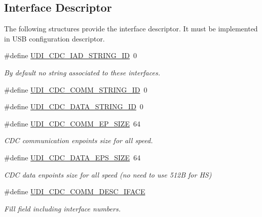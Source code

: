 \subsection*{\-Interface \-Descriptor}
\label{_amgrp550f151b99c19ed40d4ef91c78de1c3b}%
 \-The following structures provide the interface descriptor. \-It must be implemented in \-U\-S\-B configuration descriptor. \begin{DoxyCompactItemize}
\item 
\#define \hyperlink{group__udi__cdc__group_gab60b7a7764b991aff0c527e8fa0ac8c8}{\-U\-D\-I\-\_\-\-C\-D\-C\-\_\-\-I\-A\-D\-\_\-\-S\-T\-R\-I\-N\-G\-\_\-\-I\-D}~0
\begin{DoxyCompactList}\small\item\em \-By default no string associated to these interfaces. \end{DoxyCompactList}\item 
\#define \hyperlink{group__udi__cdc__group_ga4fef11b2181a17d8faac207f30c8a088}{\-U\-D\-I\-\_\-\-C\-D\-C\-\_\-\-C\-O\-M\-M\-\_\-\-S\-T\-R\-I\-N\-G\-\_\-\-I\-D}~0
\item 
\#define \hyperlink{group__udi__cdc__group_ga7f130213f9c935f192ad0e7a79654533}{\-U\-D\-I\-\_\-\-C\-D\-C\-\_\-\-D\-A\-T\-A\-\_\-\-S\-T\-R\-I\-N\-G\-\_\-\-I\-D}~0
\item 
\#define \hyperlink{group__udi__cdc__group_ga186a4ed83a0c245ad4fb377ed96ccd9c}{\-U\-D\-I\-\_\-\-C\-D\-C\-\_\-\-C\-O\-M\-M\-\_\-\-E\-P\-\_\-\-S\-I\-Z\-E}~64
\begin{DoxyCompactList}\small\item\em \-C\-D\-C communication enpoints size for all speed. \end{DoxyCompactList}\item 
\#define \hyperlink{group__udi__cdc__group_gac62f6054c333924c2bef7eddaa9e57ab}{\-U\-D\-I\-\_\-\-C\-D\-C\-\_\-\-D\-A\-T\-A\-\_\-\-E\-P\-S\-\_\-\-S\-I\-Z\-E}~64
\begin{DoxyCompactList}\small\item\em \-C\-D\-C data enpoints size for all speed (no need to use 512\-B for \-H\-S) \end{DoxyCompactList}\item 
\#define \hyperlink{group__udi__cdc__group_gad564430bd926e661c9de9c0b12b372f8}{\-U\-D\-I\-\_\-\-C\-D\-C\-\_\-\-C\-O\-M\-M\-\_\-\-D\-E\-S\-C\-\_\-\-I\-F\-A\-C\-E}
\begin{DoxyCompactList}\small\item\em \-Fill field including interface numbers. \end{DoxyCompactList}\item 

\end{DoxyCompactItemize}
